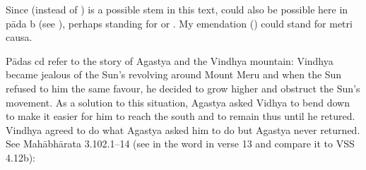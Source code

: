 { Since  (instead of ) is a possible stem in this text,                   could also be possible here in pāda b (see \msNa\msNb\msNc), perhaps standing for                   or . My emendation ()                  could stand for  metri causa.  

Pādas cd refer to the story of Agastya and the Vindhya mountain:         Vindhya became jealous of the Sun's revolving around Mount Meru and when the Sun          refused to him the same favour, he decided to grow higher and obstruct the Sun's movement.         As a solution to this situation,          Agastya asked Vidhya to bend down to make it easier for him to reach the south and         to remain thus until he retured. Vindhya agreed to do what Agastya asked him to do          but Agastya never returned. See Mahābhārata 3.102.1--14 (see in the word  in verse 13                 and compare it to VSS 4.12b):                 

}
